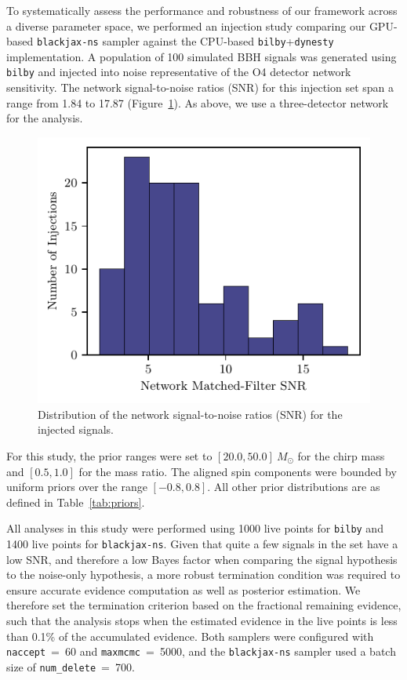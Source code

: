 \documentclass[fleqn,usenatbib]{mnras}
\begin{document}
To systematically assess the performance and robustness of our framework
across a diverse parameter space, we performed an injection study
comparing our GPU-based \texttt{blackjax-ns} sampler against the
CPU-based \texttt{bilby}+\texttt{dynesty} implementation. A population
of 100 simulated BBH signals was generated using \texttt{bilby} and
injected into noise representative of the O4 detector network
sensitivity. The network signal-to-noise ratios (SNR) for this
injection set span a range from 1.84 to 17.87 (Figure~\ref{fig:snr_dist}).
As above, we use a three-detector network for the analysis.

\begin{figure}
    \centering
    \includegraphics{figures/injection_snr_hist.pdf}
    \caption{Distribution of the network signal-to-noise ratios (SNR) for the injected signals.}
    \label{fig:snr_dist}
\end{figure}


For this study, the prior ranges were set to $[20.0, 50.0]~M_{\odot}$
for the chirp mass and $[0.5, 1.0]$ for the mass ratio. The aligned
spin components were bounded by uniform priors over the range
$[-0.8, 0.8]$. All other prior distributions are as defined in
Table~\ref{tab:priors}.

All analyses in this study were performed using 1000 live points for \texttt{bilby} and
1400 live points for \texttt{blackjax-ns}. Given that quite a few signals in the set have a low SNR, and therefore a
low Bayes factor when comparing the signal hypothesis to the noise-only
hypothesis, a more robust termination condition was required to
ensure accurate evidence computation as well as posterior estimation.
We therefore set the termination criterion based on the fractional
remaining evidence, such that the analysis stops when the estimated
evidence in the live points is less than 0.1\% of the accumulated
evidence. Both samplers were configured with
\mbox{\texttt{naccept} = 60} and \mbox{\texttt{maxmcmc} = 5000}, and the \texttt{blackjax-ns}
sampler used a batch size of \mbox{\texttt{num\_delete} = 700}. 
\end{document}
